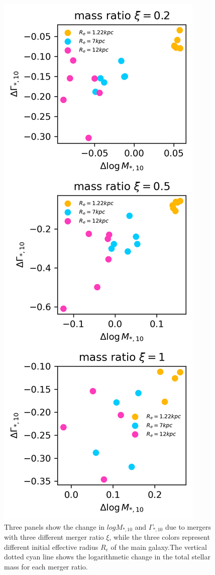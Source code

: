 \documentclass[fleqn,usenatbib]{mnras}
\begin{document}
\begin{figure}
    \centering
    \includegraphics[width=0.75\linewidth]{figure/sim_result.png}
    \caption{ Three panels show the change in $logM_{*,10}$ and $\Gamma_{*,10}$ due to mergers with three different merger ratio $\xi$, while the three colors represent different initial effective radius $R_e$ of the main galaxy.The vertical dotted cyan line shows the logarithmetic change in the total stellar mass for each merger ratio. }
    \label{fig:sim_result}
\end{figure}
\end{document}
